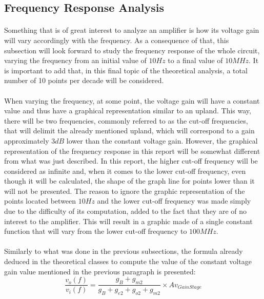 

\subsection{Frequency Response Analysis}

\paragraph{}Something that is of great interest to analyze an amplifier is how its voltage gain will vary accordingly with the frequency. As a consequence of that, this subsection will look forward to study the frequency response of the whole circuit, varying the frequency from an initial value of $10 Hz$ to a final value of $10 MHz$. It is important to add that, in this final topic of the theoretical analysis, a total number of 10 points per decade will be considered.
\paragraph{}When varying the frequency, at some point, the voltage gain will have a constant value and thus have a graphical representation similar to an upland. This way, there will be two frequencies, commonly referred to as the cut-off frequencies, that will delimit the already mentioned upland, which will correspond to a gain approximately $3dB$ lower than the constant voltage gain. However, the graphical representation of the frequency response in this report will be somewhat different from what was just described. In this report, the higher cut-off frequency will be considered as infinite and, when it comes to the lower cut-off frequency, even though it will be calculated, the shape of the graph line for points lower than it will not be presented. The reason to ignore the graphic representation of the points located between $10Hz$ and the lower cut-off frequency was made simply due to the difficulty of its computation, added to the fact that they are of no interest to the amplifier. This will result in a graphic made of a single constant function that will vary from the lower cut-off frequency to $100MHz$.  
\paragraph{}Similarly to what was done in the previous subsections, the formula already deduced in the theoretical classes to compute the value of the constant voltage gain value mentioned in the previous paragraph is presented:
\begin{equation}	
    \frac{v_o(f)}{v_i(f)}=\frac{g_B+g_{m2}}{g_B+g_{e2}+g_{o2}+g_{m2}}\times Av_{Gain Stage} 	
\end{equation}
